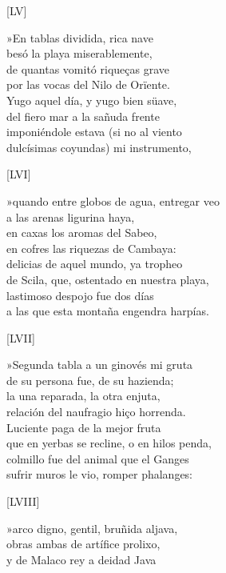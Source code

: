 \documentclass[11pt,a4paper,twoside]{article}
\begin{document}
\begin{center}
	[LV]
\end{center}\pstart
»En tablas dividida, rica nave\\
besó la playa miserablemente,\\
de quantas vomitó riqueças grave\\
por las vocas del Nilo de Orïente.\\
Yugo aquel día, y yugo bien süave,\\
del fiero mar a la sañuda frente\\
imponiéndole estava (si no al viento\\
dulcísimas coyundas) mi instrumento,\par\pend
\relax
\vfill
\newpage
%
\begin{center}
	[LVI]
\end{center}\pstart
»quando entre globos de agua, entregar veo\\
a las arenas ligurina haya,\\
en caxas los aromas del Sabeo,\\
en cofres las riquezas de Cambaya:\\
delicias de aquel mundo, ya tropheo\\
de Scila, que, ostentado en nuestra playa,\\
lastimoso despojo fue dos días\\
a las que esta montaña engendra harpías.\par\pend
%
\begin{center}
	[LVII]
\end{center}\pstart
»Segunda tabla a un ginovés mi gruta\\
de su persona fue, de su hazienda;\\
la una reparada, la otra enjuta,\\
relación del naufragio hiço horrenda.\\
Luciente paga de la mejor fruta\\
que en yerbas se recline, o en hilos penda,\\
colmillo fue del animal que el Ganges\\
sufrir muros le vio, romper phalanges:\par\pend
%
\begin{center}
	[LVIII]
\end{center}\pstart
»arco digno, gentil, bruñida aljava,\\
obras ambas de artífice prolixo,\\
y de Malaco rey a deidad Java\\
\end{document}
